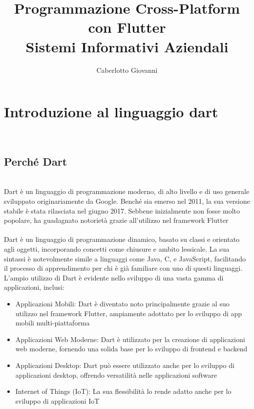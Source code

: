 \documentclass{report}
\title{\Huge{Programmazione Cross-Platform con Flutter}\\Sistemi Informativi Aziendali}
\author{\huge{Caberlotto Giovanni}}
\date{}
\begin{document}
\maketitle
\newpage%
\tableofcontents
\pagebreak

\chapter{Introduzione al linguaggio dart} %
\label{chap:Introduzione al linguaggio dart}
\\
\section{Perché Dart}
\\
Dart è un linguaggio di programmazione moderno, di alto livello e di uso generale sviluppato originariamente da Google. Benché sia emerso nel 2011, la sua versione stabile è stata rilasciata nel giugno 2017. Sebbene inizialmente non fosse molto popolare, ha guadagnato notorietà grazie all'utilizzo nel framework Flutter
\\
\\
Dart è un linguaggio di programmazione dinamico, basato su classi e orientato agli oggetti, incorporando concetti come chiusure e ambito lessicale. La sua sintassi è notevolmente simile a linguaggi come Java, C, e JavaScript, facilitando il processo di apprendimento per chi è già familiare con uno di questi linguaggi.
\\
L'ampio utilizzo di Dart è evidente nello sviluppo di una vasta gamma di applicazioni, inclusi:
\begin{itemize}
  \item{Applicazioni Mobili: Dart è diventato noto principalmente grazie al suo utilizzo nel framework Flutter, ampiamente adottato per lo sviluppo di app mobili multi-piattaforma}
  \item{Applicazioni Web Moderne: Dart è utilizzato per la creazione di applicazioni web moderne, fornendo una solida base per lo sviluppo di frontend e backend}
  \item{Applicazioni Desktop: Dart può essere utilizzato anche per lo sviluppo di applicazioni desktop, offrendo versatilità nelle applicazioni software}
  \item{Internet of Things (IoT): La sua flessibilità lo rende adatto anche per lo sviluppo di applicazioni IoT}
\end{itemize}
\end{document}
